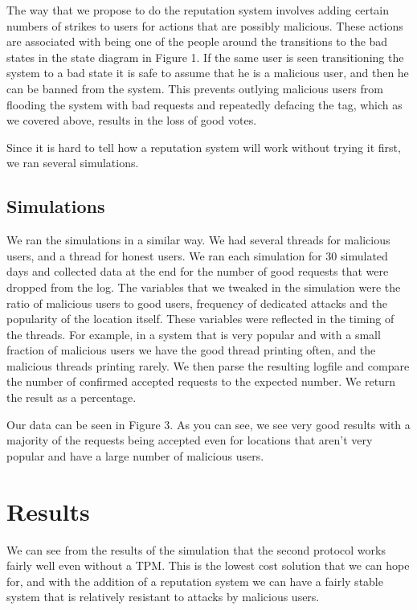 \documentclass{sig-alternate}
\begin{document}
The way that we propose to do the reputation system involves adding
certain numbers of strikes to users for actions that are possibly
malicious. These actions are associated with being one of the people
around the transitions to the bad states in the state diagram in
Figure 1. If the same user is seen transitioning the system to a bad
state it is safe to assume that he is a malicious user, and then he
can be banned from the system. This prevents outlying malicious users
from flooding the system with bad requests and repeatedly defacing the
tag, which as we covered above, results in the loss of good votes.

Since it is hard to tell how a reputation system will work without
trying it first, we ran several simulations.

\subsection{Simulations}
We ran the simulations in a similar way. We had several threads for
malicious users, and a thread for honest users. We ran each simulation
for 30 simulated days and collected data at the end for the number of
good requests that were dropped from the log. The variables that we
tweaked in the simulation were the ratio of malicious users to good
users, frequency of dedicated attacks and the popularity of the
location itself. These variables were reflected in the timing of the
threads. For example, in a system that is very popular and with a
small fraction of malicious users we have the good thread printing
often, and the malicious threads printing rarely. We then parse the
resulting logfile and compare the number of confirmed accepted
requests to the expected number. We return the result as a percentage.

Our data can be seen in Figure 3. As you can see, we see very good
results with a majority of the requests being accepted even for
locations that aren't very popular and have a large number of
malicious users.

\section{Results}
We can see from the results of the simulation that the second protocol
works fairly well even without a TPM. This is the lowest cost solution
that we can hope for, and with the addition of a reputation system we
can have a fairly stable system that is relatively resistant to
attacks by malicious users.
\end{document}
